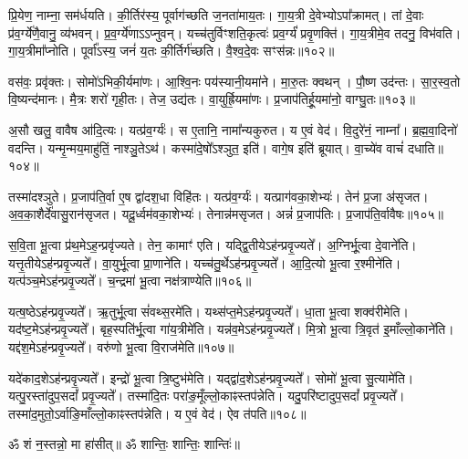 प्रि॒येण॒ नाम्ना॒ सम॑र्धयति। 
की॒र्तिर॑स्य॒ पूर्वाग॑च्छति ज॒नता॑माय॒तः। 
गा॒य॒त्री दे॒वेभ्योऽपा᳚क्रामत्। 
तां दे॒वाः प्र॑व॒र्ग्ये॑णै॒वानु॒ व्य॑भवन्। 
प्र॒व॒र्ग्ये॑णाऽऽप्नुवन्। 
यच्च॑तुर्विꣳशति॒कृत्वः॑ प्रव॒र्ग्यं॑ प्रवृ॒णक्ति॑। 
गा॒य॒त्रीमे॒व तदनु॒ विभ॑वति। 
गा॒य॒त्रीमा᳚प्नोति। 
पूर्वा᳚ऽस्य॒ जनं॑ य॒तः की॒र्तिर्ग॑च्छति। 
वै॒श्व॒दे॒वः सꣳस॑न्नः॥१०२॥

वस॑वः॒ प्रवृ॑क्तः। 
सोमो॑ऽभिकी॒र्यमा॑णः। 
आ॒श्वि॒नः पय॑स्यानी॒य\-मा॑ने। 
मा॒रु॒तः क्वथन्। 
पौ॒ष्ण उद॑न्तः। 
सा॒र॒स्व॒तो वि॒ष्यन्द॑मानः। 
मै॒त्रः  शरो॑ गृही॒तः। 
तेज॒ उद्य॑तः। 
वा॒युर्ह्रि॒यमा॑णः। 
प्र॒जाप॑तिर्\mbox{}हू॒यमा॑नो॒ वाग्घु॒तः॥१०३॥

अ॒सौ खलु॒ वावैष आ॑दि॒त्यः। 
यत्प्र॑व॒र्ग्यः॑। 
स ए॒तानि॒ नामा᳚न्यकुरुत। 
य ए॒वं वेद॑। 
वि॒दुरे॑नं॒ नाम्ना᳚। 
ब्र॒ह्म॒वा॒दिनो॑ वदन्ति। 
यन्मृ॒न्मय॒माहु॑तिं॒ नाश्ञु॒तेऽथ॑। 
कस्मा॑दे॒षो᳚ऽश्ञुत॒ इति॑। 
वागे॒ष इति॑ ब्रूयात्। 
वा॒च्ये॑व वाचं॑ दधाति॥१०४॥

तस्मा॑दश्ञुते। 
प्र॒जाप॑ति॒र्वा ए॒ष द्वा॑दश॒धा विहि॑तः। 
यत्प्र॑व॒र्ग्यः॑। 
यत्प्राग॑वका॒शेभ्यः॑। 
तेन॑ प्र॒जा अ॑सृजत। 
अ॒व॒का॒शैर्दे॑वासु॒रान॑सृजत। 
यदू॒र्ध्वम॑वका॒शेभ्यः॑। 
तेनान्न॑म\-सृजत। 
अन्नं॑ प्र॒जाप॑तिः। 
प्र॒जाप॑ति॒र्वावैषः॥१०५॥
\anuvakamend[व॒द॒न्ति॒ त॒नुवा॒ सꣳस॑न्नो हू॒यमा॑नो॒ वाग्घु॒तो द॑धात्ये॒षः]

स॒वि॒ता भू॒त्वा प्र॑थ॒मेऽह॒न्प्रवृ॑ज्यते। 
तेन॒ कामाꣳ॑ एति। 
यद्द्वि॒तीयेऽह॑न्प्रवृ॒ज्यते᳚। 
अ॒ग्निर्भू॒त्वा दे॒वाने॑ति। 
यत्तृ॒तीयेऽह॑न्प्र\-वृ॒ज्यते᳚। 
वा॒युर्भू॒त्वा प्रा॒णाने॑ति। 
यच्च॑तु॒र्थेऽह॑न्प्रवृ॒ज्यते᳚। 
आ॒दि॒त्यो भू॒त्वा र॒श्मीने॑ति। 
यत्प॑ञ्च॒मेऽह॑न्प्रवृ॒ज्यते᳚। 
च॒न्द्रमा॑ भू॒त्वा नक्ष॑त्राण्येति॥१०६॥

यत्ष॒ष्ठेऽह॑न्प्रवृ॒ज्यते᳚। 
ऋ॒तुर्भू॒त्वा सं॑वथ्स॒रमे॑ति। 
यथ्स॑प्त॒मेऽह॑न्प्र\-वृ॒ज्यते᳚। 
धा॒ता भू॒त्वा शक्व॑रीमेति। 
यद॑ष्ट॒मेऽह॑न्प्रवृ॒ज्यते᳚। 
बृह॒स्पति॑र्भू॒त्वा गा॑य॒त्रीमे॑ति। 
यन्न॑व॒मेऽह॑न्प्रवृ॒ज्यते᳚। 
मि॒त्रो भू॒त्वा त्रि॒वृत॑ इ॒माँल्लो॒काने॑ति। 
यद्द॑श॒मेऽह॑न्प्रवृ॒ज्यते᳚। 
वरु॑णो भू॒त्वा वि॒राज॑मेति॥१०७॥

यदे॑काद॒शेऽह॑न्प्रवृ॒ज्यते᳚। 
इन्द्रो॑ भू॒त्वा त्रि॒ष्टुभ॑मेति। 
यद्द्वा॑द॒शेऽह॑न्प्र\-वृ॒ज्यते᳚। 
सोमो॑ भू॒त्वा सु॒त्यामे॑ति। 
यत्पु॒रस्ता॑दुप॒सदां᳚ प्रवृ॒ज्यते᳚। 
तस्मा॑दि॒तः परा॑ङ॒मूँल्लो॒काꣴ\-स्तप॑न्नेति। 
यदु॒परि॑ष्टादुप॒सदां᳚ प्रवृ॒ज्यते᳚। 
तस्मा॑द॒मुतो॒ऽर्वा\-ङि॒माँल्लो॒काꣴ\-स्तप॑न्नेति। 
य ए॒वं वेद॑। 
ऐव त॑पति॥१०८॥
\anuvakamend[नक्ष॑त्राण्येति वि॒राज॑मेति तपति]

ॐ शं न॒स्तन्नो॒ मा हा॑सीत्॥ ॐ शान्तिः॒ शान्तिः॒ शान्तिः॑॥

\closesection